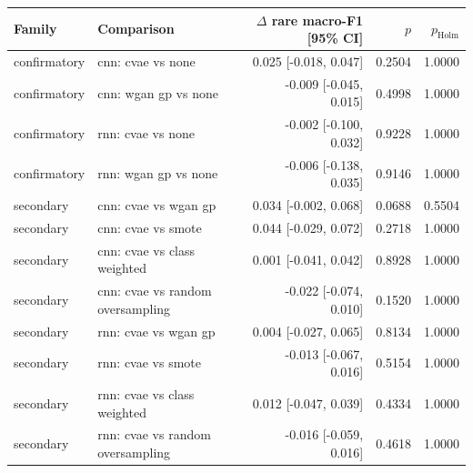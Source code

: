 \begin{tabular}{llrrr}
\toprule
Family & Comparison & $\Delta$ rare macro-F1 [95\% CI] & $p$ & $p_{\mathrm{Holm}}$ \\
\midrule
confirmatory & cnn: cvae vs none & 0.025 [-0.018, 0.047] & 0.2504 & 1.0000 \\
confirmatory & cnn: wgan gp vs none & -0.009 [-0.045, 0.015] & 0.4998 & 1.0000 \\
confirmatory & rnn: cvae vs none & -0.002 [-0.100, 0.032] & 0.9228 & 1.0000 \\
confirmatory & rnn: wgan gp vs none & -0.006 [-0.138, 0.035] & 0.9146 & 1.0000 \\
secondary & cnn: cvae vs wgan gp & 0.034 [-0.002, 0.068] & 0.0688 & 0.5504 \\
secondary & cnn: cvae vs smote & 0.044 [-0.029, 0.072] & 0.2718 & 1.0000 \\
secondary & cnn: cvae vs class weighted & 0.001 [-0.041, 0.042] & 0.8928 & 1.0000 \\
secondary & cnn: cvae vs random oversampling & -0.022 [-0.074, 0.010] & 0.1520 & 1.0000 \\
secondary & rnn: cvae vs wgan gp & 0.004 [-0.027, 0.065] & 0.8134 & 1.0000 \\
secondary & rnn: cvae vs smote & -0.013 [-0.067, 0.016] & 0.5154 & 1.0000 \\
secondary & rnn: cvae vs class weighted & 0.012 [-0.047, 0.039] & 0.4334 & 1.0000 \\
secondary & rnn: cvae vs random oversampling & -0.016 [-0.059, 0.016] & 0.4618 & 1.0000 \\
\bottomrule
\end{tabular}
